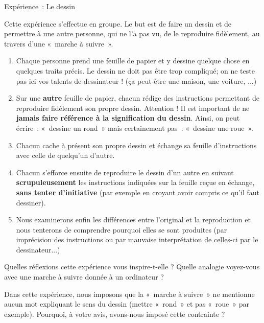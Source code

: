 \clearpage
		\begin{Emphase}[exercice]{Expérience~: Le dessin}

			Cette expérience s'effectue en groupe.
			Le but est de faire un dessin et de permettre à une autre personne, qui
			ne l'a pas vu, de le reproduire fidèlement, au travers
			d'une «~marche à suivre~».

			\begin{enumerate}
			\item
				Chaque personne prend une feuille de papier et 
				y dessine quelque chose en quelques traits précis. 
				Le dessin ne doit pas être trop compliqué; 
				on ne teste pas ici vos talents de dessinateur ! 
				(ça peut-être une maison, une voiture, ...)
			\item
				Sur une \textbf{autre} feuille de papier, 
				chacun rédige des instructions permettant de 
				reproduire fidèlement son propre dessin. 
				Attention ! Il est important de ne
				\textbf{jamais faire référence à la signification du dessin}. 
				Ainsi, on peut écrire~: «~dessine un rond~» 
				mais certainement pas~: «~dessine une roue~».
			\item
				Chacun cache à présent son propre dessin et échange 
				sa feuille d'instructions avec celle de quelqu'un d'autre.
			\item
				Chacun s'efforce ensuite de reproduire le dessin d'un autre 
				en suivant \textbf{scrupuleusement} les instructions indiquées 
				sur la feuille reçue en échange, \textbf{sans tenter
				d'initiative} (par exemple en croyant avoir compris ce
				qu'il faut dessiner).
			\item
				Nous examinerons enfin les différences entre l'original et 
				la reproduction et nous tenterons de comprendre pourquoi 
				elles se sont produites (par imprécision des instructions ou
				par mauvaise interprétation de celles-ci par le dessinateur...)
			\end{enumerate}

		\end{Emphase}

\bigskip
		Quelles réflexions cette expérience vous inspire-t-elle ?
		Quelle analogie voyez-vous avec une marche à suivre donnée à un
		ordinateur ?

		Dans cette expérience, nous imposons que la «~marche à suivre~» ne mentionne
		aucun mot expliquant le sens du dessin (mettre «~rond~» et pas «~roue~»
		par exemple). Pourquoi, à votre avis, avons-nous imposé cette
		contrainte ?

